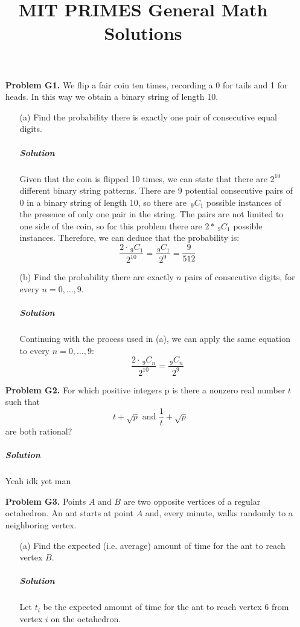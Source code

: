 \documentclass[10pt,a4paper]{article}
\title{MIT PRIMES General Math Solutions}
\newcommand{\nCr}[2]{\,_{#1}C_{#2}} %
\begin{document}
	\begin{itemize}
		\item[\textbf{Problem G1.}] We flip a fair coin ten times, recording a 0 for tails and 1 for heads. In this way we obtain a binary string of length 10.
		
		\begin{enumerate}
			\item[(a)] Find the probability there is exactly one pair of consecutive equal digits.
			
			\subparagraph{Solution}Given that the coin is flipped 10 times, we can state that there are $2^{10}$ different binary string patterns. There are 9 potential consecutive pairs of 0 in a binary string of length 10, so there are $\nCr{9}{1}$ possible instances of the presence of only one pair in the string. The pairs are not limited to one side of the coin, so for this problem there are $2*\nCr{9}{1}$ possible instances. Therefore, we can deduce that the probability is:
			\[ \frac{2\cdot\nCr{9}{1}}{2^{10}}=\frac{\nCr{9}{1}}{2^{9}}=\frac{9}{512} \]
			
			\item[(b)] Find the probability there are exactly $n$ pairs of consecutive digits, for every $n=0,\dotsc,9$.
			
			\subparagraph{Solution}Continuing with the process used in (a), we can apply the same equation to every $n=0,\dotsc,9$:
			\[ \frac{2\cdot\nCr{9}{n}}{2^{10}}=\frac{\nCr{9}{n}}{2^{9}} \]
		\end{enumerate}
		
		\item[\textbf{Problem G2.}] For which positive integers p is there a nonzero real number $t$ such that \[ t+\sqrt{p}  \text{ and } \frac{1}{t}+\sqrt{p}\] are both rational?
		
		\subparagraph{Solution}Yeah idk yet man
		
		\item[\textbf{Problem G3.}] Points $A$ and $B$ are two opposite vertices of a regular octahedron. An ant starts at point $A$ and, every minute, walks randomly to a neighboring vertex.
		
		\begin{enumerate}
			\item[(a)] Find the expected (i.e. average) amount of time for the ant to reach vertex $B$.
			
			\subparagraph{Solution} Let $t_i$ be the expected amount of time for the ant to reach vertex 6 from vertex $i$ on the octahedron.
			

\end{enumerate}
\end{itemize}
\end{document}
